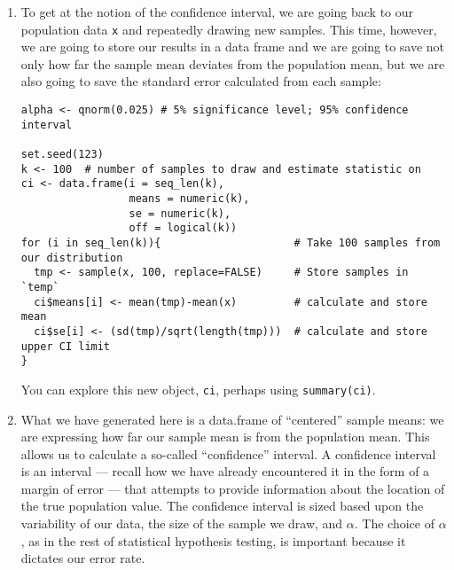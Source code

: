 \documentclass[a4paper,12pt]{article}
\begin{document}
\begin{enumerate}
\vspace{6em}

\item To get at the notion of the confidence interval, we are going back to our population data \texttt{x} and repeatedly drawing new samples. This time, however, we are going to store our results in a data frame and we are going to save not only how far the sample mean deviates from the population mean, but we are also going to save the standard error calculated from each sample:

\begin{verbatim}
alpha <- qnorm(0.025) # 5% significance level; 95% confidence interval

set.seed(123)
k <- 100  # number of samples to draw and estimate statistic on
ci <- data.frame(i = seq_len(k),
                 means = numeric(k),
                 se = numeric(k),
                 off = logical(k))
for (i in seq_len(k)){                     # Take 100 samples from our distribution
  tmp <- sample(x, 100, replace=FALSE)     # Store samples in `temp`
  ci$means[i] <- mean(tmp)-mean(x)         # calculate and store mean
  ci$se[i] <- (sd(tmp)/sqrt(length(tmp)))  # calculate and store upper CI limit
}
\end{verbatim}

\noindent You can explore this new object, \texttt{ci}, perhaps using \texttt{summary(ci)}.

\item What we have generated here is a data.frame of ``centered'' sample means: we are expressing how far our sample mean is from the population mean. This allows us to calculate a so-called ``confidence'' interval. A confidence interval is an interval --- recall how we have already encountered it in the form of a margin of error --- that attempts to provide information about the location of the true population value. The confidence interval is sized based upon the variability of our data, the size of the sample we draw, and $\alpha$. The choice of $\alpha$, as in the rest of statistical hypothesis testing, is important because it dictates our error rate. 


\end{enumerate}
\end{document}
